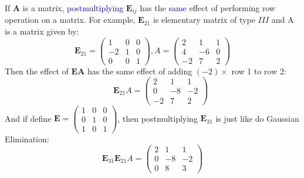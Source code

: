 \begin{proposition}
If $\bm A$ is a matrix, \textcolor{blue}{postmultiplying} $\bm E_{ij}$ has the \textcolor{blue}{same} effect of performing row operation on a matrix. For example, $\bm E_{21}$ is elementary matrix of type $III$ and A is a matrix given by:
\[\bm E_{21} = \begin{pmatrix}
1 & 0 & 0 \\ -2 & 1 & 0 \\ 0 & 0 & 1
\end{pmatrix}, A = \begin{pmatrix}
2 & 1 & 1 \\ 4 & -6 & 0 \\ -2 & 7 & 2
\end{pmatrix}\]
Then the effect of $\bm E \bm A$ has the same effect of adding $(-2)\times$ row 1 to row 2:
\[\qquad \bm E_{21}A = \begin{pmatrix}
2 & 1 & 1 \\ 0 & -8 & -2 \\ -2 & 7 & 2
\end{pmatrix}\]
 And if define $\bm E = \begin{pmatrix}
1 & 0 & 0 \\ 0 & 1 & 0 \\ 1 & 0 & 1
\end{pmatrix}$, then postmultiplying $\bm E_{31}$ is just like do Gaussian Elimination:
\[
\bm E_{31}\bm E_{21} A = 
\begin{pmatrix}
2 & 1 & 1 \\ 0 & -8 & -2 \\ 0 & 8 & 3
\end{pmatrix}
\]
\end{proposition}